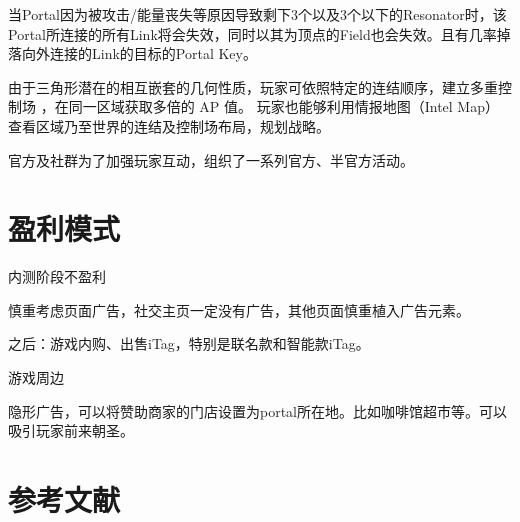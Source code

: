 \documentclass[UTF8]{ctexart}
\begin{document}
\begin{tcolorbox}
    当Portal因为被攻击/能量丧失等原因导致剩下3个以及3个以下的Resonator时，该Portal所连接的所有Link将会失效，同时以其为顶点的Field也会失效。且有几率掉落向外连接的Link的目标的Portal Key。

    由于三角形潜在的相互嵌套的几何性质，玩家可依照特定的连结顺序，建立多重控制场 ，在同一区域获取多倍的 AP 值。 玩家也能够利用情报地图（Intel Map）查看区域乃至世界的连结及控制场布局，规划战略。
\end{tcolorbox}


官方及社群为了加强玩家互动，组织了一系列官方、半官方活动。

\section{盈利模式}

内测阶段不盈利

慎重考虑页面广告，社交主页一定没有广告，其他页面慎重植入广告元素。

之后：游戏内购、出售iTag，特别是联名款和智能款iTag。

游戏周边

隐形广告，可以将赞助商家的门店设置为portal所在地。比如咖啡馆超市等。可以吸引玩家前来朝圣。

\section{参考文献}



\end{document}
